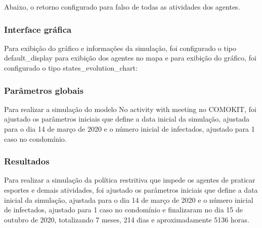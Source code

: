 
Abaixo, o retorno configurado para falso de todas as atividades dos agentes.



\subsubsection{Interface gráfica}

Para exibição do gráfico e informações da simulação, foi configurado o tipo default\_display para exibição dos agentes no mapa e para exibição do gráfico, foi configurado o tipo states\_evolution\_chart:



\subsubsection{Parâmetros globais}

Para realizar a simulação do modelo No activity with meeting no COMOKIT, foi ajustado os parâmetros iniciais que define a data inicial da simulação, ajustada para o dia 14 de março de 2020 e o número inicial de infectados, ajustado para 1 caso no condomínio.


\subsubsection{Resultados}

Para realizar a simulação da política restritiva que impede os agentes de praticar esportes e demais atividades, foi ajustado os parâmetros iniciais que define a data inicial da simulação, ajustada para o dia 14 de março de 2020 e o número inicial de infectados, ajustado para 1 caso no condomínio e finalizaram no dia 15 de outubro de 2020, totalizando 7 meses, 214 dias e aproximadamente 5136 horas.

